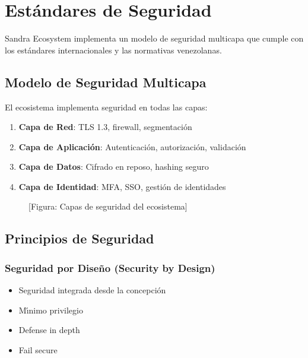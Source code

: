 \chapter{Est\'andares de Seguridad}

Sandra Ecosystem implementa un modelo de seguridad multicapa que cumple con los est\'andares internacionales y las normativas venezolanas.

\section{Modelo de Seguridad Multicapa}

El ecosistema implementa seguridad en todas las capas:

\begin{enumerate}
\item \textbf{Capa de Red}: TLS 1.3, firewall, segmentaci\'on
\item \textbf{Capa de Aplicaci\'on}: Autenticaci\'on, autorizaci\'on, validaci\'on
\item \textbf{Capa de Datos}: Cifrado en reposo, hashing seguro
\item \textbf{Capa de Identidad}: MFA, SSO, gesti\'on de identidades
\end{enumerate}

\begin{figure}[H]
\centering
\begin{minipage}{\textwidth}
\begin{center}
[Figura: Capas de seguridad del ecosistema]
\end{center}
\end{minipage}
\end{figure}

\section{Principios de Seguridad}

\subsection{Seguridad por Dise\~no (Security by Design)}
\begin{itemize}
\item Seguridad integrada desde la concepci\'on
\item M\'{\i}nimo privilegio
\item Defense in depth
\item Fail secure
\end{itemize}

